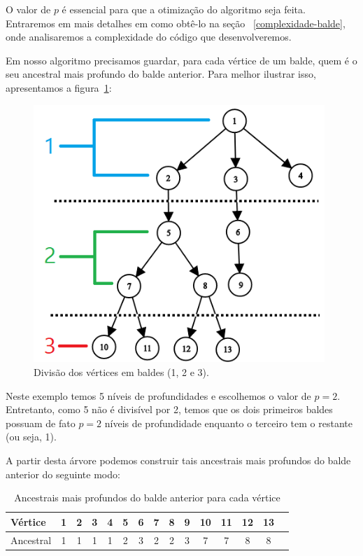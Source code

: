 O valor de $p$ é essencial para que a otimização do algoritmo seja feita. Entraremos em mais detalhes em como obtê-lo na seção ~\ref{complexidade-balde}, onde analisaremos a complexidade do código que desenvolveremos.

Em nosso algoritmo precisamos guardar, para cada vértice de um balde, quem é o seu ancestral mais profundo do balde anterior. Para melhor ilustrar isso, apresentamos a figura~\ref{fig:arvore-baldes}:

\vspace{5cm}

\begin{figure}[htb]
\begin{center}
\includegraphics[width=11cm]{images/tree_buckets.png}
\end{center}
\caption{\label{fig:arvore-baldes}Divisão dos vértices em baldes (1, 2 e 3).}
\end{figure}

Neste exemplo temos 5 níveis de profundidades e escolhemos o valor de $p = 2$. Entretanto, como 5 não é divisível por 2, temos que os dois primeiros baldes possuam de fato $p = 2$ níveis de profundidade enquanto o terceiro tem o restante (ou seja, 1).

A partir desta árvore podemos construir tais ancestrais mais profundos do balde anterior do seguinte modo:

\begin{table}[htb]
\centering
\begin{tabular}{|l|c|c|c|c|c|c|c|c|c|c|c|c|c|c|}
\hline
Vértice   & 1 & 2 & 3 & 4 & 5 & 6 & 7 & 8 & 9 & 10 & 11 & 12 & 13 \\ \hline
Ancestral & 1 & 1 & 1 & 1 & 2 & 3 & 2 & 2 & 3 & 7  & 7  & 8  & 8 \\ \hline
\end{tabular}
\caption{Ancestrais mais profundos do balde anterior para cada vértice}
\end{table}

